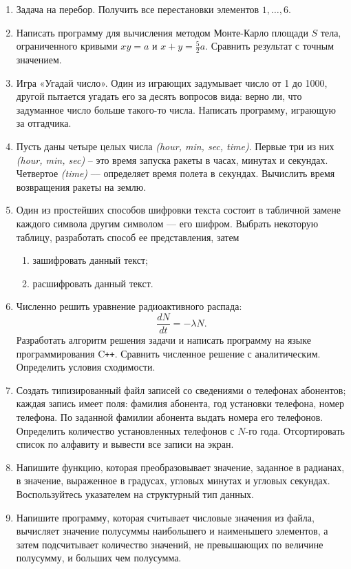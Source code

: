 \begin{enumerate}[leftmargin=*]
    \item Задача на перебор. Получить все перестановки элементов $1, … , 6$.
    \item Написать программу для вычисления методом Монте-Карло площади $S$ тела, ограниченного кривыми $xy=a$ и $x+y=\frac{5}{2}a$. Сравнить результат с точным значением.
    \item Игра «Угадай число». Один из играющих задумывает число от 1 до 1000, другой пытается угадать его за десять вопросов вида: верно ли, что задуманное число больше такого-то числа. Написать программу, играющую за отгадчика.
    \item Пусть даны четыре целых числа \textit{(hour, min, sec, time)}. Первые три из них \textit{(hour, min, sec)} – это время запуска ракеты в часах, минутах и секундах. Четвертое \textit{(time)} –-- определяет время полета в секундах. Вычислить время возвращения ракеты на землю.
    \item Один из простейших способов шифровки текста состоит в табличной замене каждого символа другим символом --- его шифром. Выбрать некоторую таблицу, разработать способ ее представления, затем
    \begin{enumerate}[label=\asbuk*)]
        \item зашифровать данный текст;
        \item расшифровать данный текст.
    \end{enumerate}
    \item Численно решить уравнение радиоактивного распада:
    \begin{equation*}
        \dfrac{dN}{dt} = -\lambda N .
    \end{equation*}
    Разработать алгоритм решения  задачи и написать программу на языке программирования C\texttt{++}. Сравнить численное решение с аналитическим. Определить условия сходимости.
    \item Создать типизированный файл записей со сведениями о телефонах абонентов; каждая запись имеет поля: фамилия абонента, год установки телефона, номер телефона. По заданной фамилии абонента выдать номера его телефонов. Определить количество установленных телефонов с $N$-го года. Отсортировать список по алфавиту и вывести все записи на экран.
    \item Напишите функцию, которая преобразовывает значение, заданное в радианах, в значение, выраженное в градусах, угловых минутах и угловых секундах. Воспользуйтесь указателем на структурный тип данных.
    \item Напишите программу, которая считывает числовые значения из файла, вычисляет значение полусуммы наибольшего и наименьшего элементов, а затем подсчитывает количество значений, не превышающих по величине полусумму, и больших чем полусумма.

\end{enumerate}
